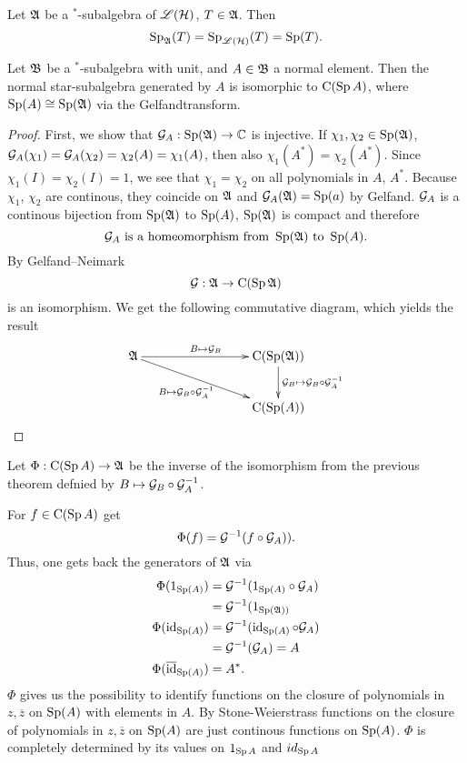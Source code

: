 \begin{cor}
 Let $\mathfrak{A}$ be a $^*$-subalgebra of $\mathscr{L}(\mathcal{H})$, $T \in \mathfrak{A}$. Then 
\[
 \operatorname{Sp}_{\mathfrak{A}} (T) = \operatorname{Sp}_{\mathscr{L}(\mathcal{H})}(T) = \operatorname{Sp}(T).
\]
\end{cor}

\begin{prop}
 Let $\mathfrak{B}$ be a $^*$-subalgebra with unit, and $A \in \mathfrak{B}$ a normal element. Then the normal star-subalgebra generated by $A$ is isomorphic to $\operatorname{C} (\operatorname{Sp} A)$, where $\operatorname{Sp}(A) \cong \operatorname{Sp}(\mathfrak{A})$ via the Gelfandtransform.
\end{prop}

\begin{proof}
 First, we show that $\mathcal{G}_A : \operatorname{Sp}(\mathfrak{A}) \to \mathbb{C}$ is injective. If $\chi_1 , \chi_2 \in \operatorname{Sp}(\mathfrak{A})$, $\mathcal{G}_A(\chi_1) = \mathcal{G}_A(\chi_2)=\chi_2(A)=\chi_1(A)$, then also $\chi_1(A^*)=\chi_2(A^*)$. Since $\chi_1(I)=\chi_2(I)=1$, we see that $\chi_1 = \chi_2$ on all polynomials in $A$, $A^*$. Because $\chi_1$, $\chi_2$ are continous, they coincide on $\mathfrak{A}$ and $\mathcal{G}_A(\mathfrak{A})=\operatorname{Sp}(a)$ by Gelfand. $\mathcal{G}_A$ is a continous bijection from $\operatorname{Sp}(\mathfrak{A})$ to $\operatorname{Sp}(A)$, $\operatorname{Sp}(\mathfrak{A})$ is compact and therefore
\[
 \mathcal{G}_A \text{ is a homeomorphism from } \operatorname{Sp}(\mathfrak{A}) \text{ to } \operatorname{Sp}(A).
\]
By Gelfand--Neimark 
\[
 \mathcal{G} : \mathfrak{A} \to \operatorname{C}(\operatorname{Sp} \mathfrak{A})
\]
is an isomorphism. We get the following commutative diagram, which yields the result
\[
\xymatrix{
 \A \ar[rrr]^{{B \mapsto \G_B}} \ar[drrr]_{B \mapsto \G_B \circ \G_A \inv~~~} &&& \cf(\spe(\A)) \ar[d]^{\G_B \mapsto \G_B \circ \G_A \inv} \\
   &&&  \cf(\spe(A))}
\]




\end{proof}

\begin{rem}
  Let $\Phi : \operatorname{C} (\operatorname{Sp} A) \to \mathfrak{A}$ be the inverse of the isomorphism from the previous theorem defnied by $B \mapsto \mathcal{G}_B \circ \mathcal{G}_A ^{-1}$.
 
  For $f \in \operatorname{C}(\operatorname{Sp} A)$ get 
  \[
   \Phi (f) = \mathcal{G} ^{-1} (f \circ \mathcal{G}_A)).
  \]
  Thus, one gets back the generators of $\mathfrak{A}$ via
   \begin{align*}
      \Phi (1_{\operatorname{Sp}(A)})   		&= \mathcal{G} ^{-1} (1 _{\operatorname{Sp}(A)} \circ \mathcal{G}_A ) \\
				    &= \mathcal{G} ^{-1} (1_{\operatorname{Sp}(\mathfrak{A}))} \\
      \Phi (\operatorname{id}_{\operatorname{Sp} (A)})		&= \mathcal{G} ^{-1} (\operatorname{id}_{\operatorname{Sp} (A)} \circ \mathcal{G}_A) \\
				    &= \mathcal{G} ^{-1} (\mathcal{G}_A) = A \\
      \Phi (\overline{\operatorname{id}}_{\operatorname{Sp} (A)}) 	&= A^*.
   \end{align*}
  $\Phi$ gives us the possibility to identify functions on the closure of polynomials in $z, \overline{z}$ on $\operatorname{Sp} (A)$ with elements in $A$. By Stone-Weierstrass functions on the closure of polynomials in $z, \overline{z}$ on $\operatorname{Sp} (A)$ are just continous functions on $\operatorname{Sp} (A)$. $\Phi$ is completely determined by its values on $1_{\operatorname{Sp} A}$ and $id_{\operatorname{Sp} A}$
\end{rem}

